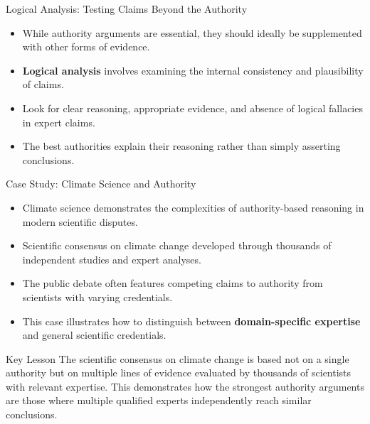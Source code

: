 \documentclass{beamer}
\begin{document}
\begin{frame}{Logical Analysis: Testing Claims Beyond the Authority}
    \begin{itemize}
        \item While authority arguments are essential, they should ideally be supplemented with other forms of evidence.
        \item \textbf{Logical analysis} involves examining the internal consistency and plausibility of claims.
        \item Look for clear reasoning, appropriate evidence, and absence of logical fallacies in expert claims.
        \item The best authorities explain their reasoning rather than simply asserting conclusions.
    \end{itemize}
    
\end{frame}

\begin{frame}{Case Study: Climate Science and Authority}
    \begin{itemize}
        \item Climate science demonstrates the complexities of authority-based reasoning in modern scientific disputes.
        \item Scientific consensus on climate change developed through thousands of independent studies and expert analyses.
        \item The public debate often features competing claims to authority from scientists with varying credentials.
        \item This case illustrates how to distinguish between \textbf{domain-specific expertise} and general scientific credentials.
    \end{itemize}
    
    \begin{alertblock}{Key Lesson}
        The scientific consensus on climate change is based not on a single authority but on multiple lines of evidence evaluated by thousands of scientists with relevant expertise. This demonstrates how the strongest authority arguments are those where multiple qualified experts independently reach similar conclusions.
    \end{alertblock}
\end{frame}
\end{document}
